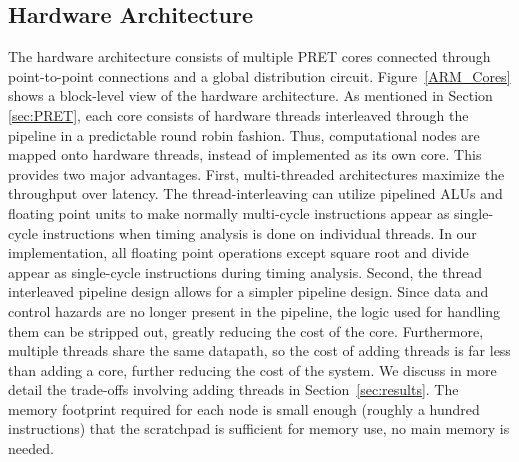 \subsection{Hardware Architecture} 
\label{sec:hardware_architecture}
The hardware architecture consists of multiple PRET cores connected through point-to-point connections and a global distribution circuit.
Figure~\ref{ARM_Cores} shows a block-level view of the hardware architecture.   
As mentioned in Section \ref{sec:PRET}, each core consists of hardware threads interleaved through the pipeline in a predictable round robin fashion.
Thus, computational nodes are mapped onto hardware threads, instead of implemented as its own core.
This provides two major advantages.  
First, multi-threaded architectures maximize the throughput over latency.  
The thread-interleaving can utilize pipelined ALUs and floating point units to make normally multi-cycle instructions appear as single-cycle instructions when timing analysis is done on individual threads. 
In our implementation, all floating point operations except square root and divide appear as single-cycle instructions during timing analysis.      
Second, the thread interleaved pipeline design allows for a simpler pipeline design.
Since data and control hazards are no longer present in the pipeline, the logic used for handling them can be stripped out, greatly reducing the cost of the core.
Furthermore, multiple threads share the same datapath, so the cost of adding threads is far less than adding a core, further reducing the cost of the system.
We discuss in more detail the trade-offs involving adding threads in Section~\ref{sec:results}.
The memory footprint required for each node is small enough (roughly a hundred instructions) that the scratchpad is sufficient for memory use, no main memory is needed.

